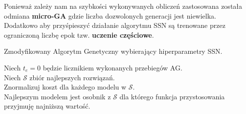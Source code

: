 \documentclass{article}
\begin{document}
Ponieważ zależy nam na szybkości wykonywanych obliczeń zastosowana została odmiana 
\textbf{micro-GA} gdzie liczba dozwolonych generacji jest niewielka. Dodatkowo aby przyśpieszyć
działanie algorytmu SSN są trenowane przez ograniczoną liczbę epok tzw. \textbf{uczenie
częściowe}.

\begin{algorithm}[H]
 \SetAlgoLined
 \caption{Zmodyfikowany Algorytm Genetyczny wybierający hiperparametry SSN.}
 Niech $t_e = 0$ będzie licznikiem wykonanych przebiegów AG.\\
 Niech $\mathcal{S}$ zbiór najlepszych rozwiązań.\\
  Znormalizuj koszt dla każdego modelu w $\mathcal{S}$.\\
  Najlepszym modelem jest osobnik z $\mathcal{S}$ dla którego funkcja przystosowania
  przyjmuję najniższą wartość.
\end{algorithm}
\end{document}
